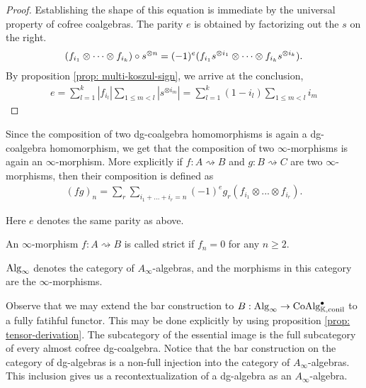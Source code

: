 \documentclass[../thesis.tex]{subfiles}
\begin{document}
        \begin{proof}
            Establishing the shape of this equation is immediate by the universal property of cofree coalgebras. The parity $e$ is obtained by factorizing out the $s$ on the right.
            \begin{align*}
                (f_{i_1} \otimes \cdots \otimes f_{i_k}) \circ s^{\otimes n} = (-1)^e(f_{i_1}s^{\otimes i_1} \otimes \cdots \otimes f_{i_k}s^{\otimes i_k})\tt{.}
            \end{align*}
            By proposition \ref{prop: multi-koszul-sign}, we arrive at the conclusion,
            \begin{align*}
                e = \sum_{l = 1}^k|f_{i_l}|\sum_{1\leq m < l}|s^{\otimes i_m}|= \sum_{l = 1}^k(1- i_l)\sum_{1 \leq m < l}i_m
            \end{align*}
        \end{proof}

        Since the composition of two dg-coalgebra homomorphisms is again a dg-coalgebra homomorphism, we get that the composition of two $\infty$-morphisms is again an $\infty$-morphism. More explicitly if $f:A\rightsquigarrow B$ and $g: B\rightsquigarrow C$ are two $\infty$-morphisms, then their composition is defined as
        \begin{align*}
            (fg)_n = \sum_r\sum_{i_1 + ... + i_r = n} (-1)^eg_r(f_{i_1}\otimes ... \otimes f_{i_r})\text{.}
        \end{align*}

        Here $e$ denotes the same parity as above.

        \begin{definition}
            An $\infty$-morphism $f: A\rightsquigarrow B$ is called strict if $f_n = 0$ for any $n\geq 2$. 
        \end{definition}

        \begin{definition}
            $\tt{Alg}_\infty$ denotes the category of $A_\infty$-algebras, and the morphisms in this category are the $\infty$-morphisms.
        \end{definition}

        Observe that we may extend the bar construction to $B : \tt{Alg}_\infty \rightarrow \tt{Co\tt{Alg}}_{\mathbb{K},\tt{conil}}^\bullet$ to a fully fatihful functor. This may be done explicitly by using proposition \ref{prop: tensor-derivation}. The subcategory of the essential image is the full subcategory of every almost cofree dg-coalgebra. Notice that the bar construction on the category of dg-algebras is a non-full injection into the category of $A_\infty$-algebras. This inclusion gives us a recontextualization of a dg-algebra as an $A_\infty$-algebra.
\end{document}
